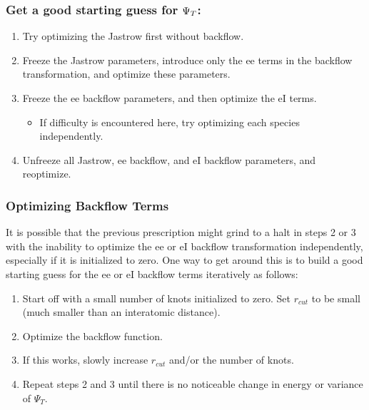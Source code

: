 \documentclass[letterpaper,10pt,english]{sphinxmanual}
\begin{document}
\subsubsection{Get a good starting guess for \protect\(\Psi_T\protect\):}
\label{\detokenize{intro_wavefunction:get-a-good-starting-guess-for-psi-t}}\begin{enumerate}
%
\item {} 
Try optimizing the Jastrow first without backflow.

\item {} 
Freeze the Jastrow parameters, introduce only the e\sphinxhyphen{}e terms in the
backflow transformation, and optimize these parameters.

\item {} 
Freeze the e\sphinxhyphen{}e backflow parameters, and then optimize the e\sphinxhyphen{}I terms.
\begin{itemize}
\item {} 
If difficulty is encountered here, try optimizing each species
independently.

\end{itemize}

\item {} 
Unfreeze all Jastrow, e\sphinxhyphen{}e backflow, and e\sphinxhyphen{}I backflow parameters, and
reoptimize.

\end{enumerate}


\subsubsection{Optimizing Backflow Terms}
\label{\detokenize{intro_wavefunction:optimizing-backflow-terms}}
It is possible that the previous prescription might grind to a halt in steps 2 or 3 with the inability to optimize the e\sphinxhyphen{}e or e\sphinxhyphen{}I backflow transformation independently, especially if it is initialized to zero.  One way to get around this is to build a good starting guess for the e\sphinxhyphen{}e or e\sphinxhyphen{}I backflow terms iteratively as follows:
\begin{enumerate}
%
\item {} 
Start off with a small number of knots initialized to zero. Set
\(r_{cut}\) to be small (much smaller than an interatomic distance).

\item {} 
Optimize the backflow function.

\item {} 
If this works, slowly increase \(r_{cut}\) and/or the number of
knots.

\item {} 
Repeat steps 2 and 3 until there is no noticeable change in energy or
variance of \(\Psi_T\).

\end{enumerate}
\end{document}
